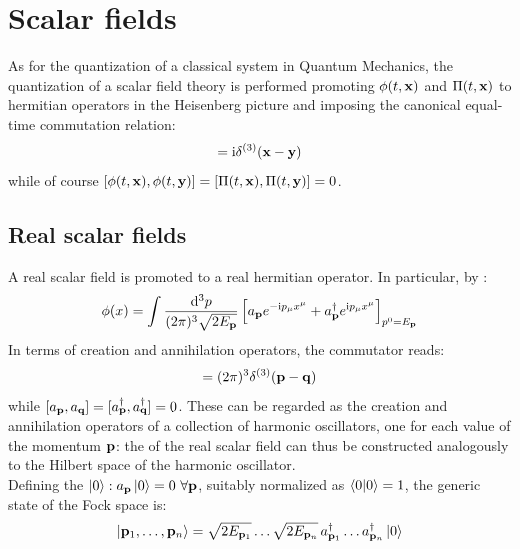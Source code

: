 
\section{Scalar fields}

As for the quantization of a classical system in Quantum Mechanics, the quantization of a scalar field theory is performed promoting $ \phi(t,\mathbf{x}) $ and $ \Pi(t,\mathbf{x}) $ to hermitian operators in the Heisenberg picture and imposing the canonical equal-time commutation relation:
\begin{equation}
  [\phi(t,\ve{x}) , \Pi(t,\ve{y})] = \img \delta^{(3)}(\ve{x} - \ve{y})
  \label{eq:scalar-quant-comm}
\end{equation}
while of course $ [\phi(t,\mathbf{x}) , \phi(t,\mathbf{y})] = [\Pi(t,\mathbf{x}) , \Pi(t,\mathbf{y})] = 0 $.

\subsection{Real scalar fields}

A real scalar field is promoted to a real hermitian operator. In particular, by :
\begin{equation}
  \phi(x) = \int \frac{\mathrm{d}^3p}{(2\pi)^3 \sqrt{2E_{\mathbf{p}}}} \left[ a_{\mathbf{p}} e^{-\mathrm{i} p_\mu x^\mu} + a_{\mathbf{p}}^\dagger e^{\mathrm{i} p_\mu x^\mu} \right]_{p^0 = E_{\mathbf{p}}}
  \label{eq:scalar-quant-exp}
\end{equation}
In terms of creation and annihilation operators, the commutator  reads:
\begin{equation}
  [a_\ve{p} , a_\ve{q}^\dagger] = (2\pi)^3 \delta^{(3)}(\ve{p} - \ve{q})
  \label{eq:scalar-quant-op-comm}
\end{equation}
while $ [a_{\mathbf{p}} , a_{\mathbf{q}}] = [a_{\mathbf{p}}^\dagger , a_{\mathbf{q}}^\dagger] = 0 $. These can be regarded as the creation and annihilation operators of a collection of harmonic oscillators, one for each value of the momentum $ \mathbf{p} $: the  of the real scalar field can thus be constructed analogously to the Hilbert space of the harmonic oscillator.\\
Defining the  $ \ket{0} : a_{\mathbf{p}} \ket{0} = 0 \,\,\forall \mathbf{p} $, suitably normalized as $ \braket{0 | 0} = 1 $, the generic state of the Fock space is:
\begin{equation}
  \ket{\mathbf{p}_1 , \dots , \mathbf{p}_n} = \sqrt{2E_{\mathbf{p}_1}} \dots \sqrt{2E_{\mathbf{p}_n}}\, a_{\mathbf{p}_1}^\dagger \dots a_{\mathbf{p}_n}^\dagger \ket{0}
\end{equation}

